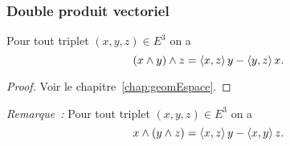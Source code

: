 \subsubsection{Double produit vectoriel}

\begin{theo}
  Pour tout triplet $(x,y,z) \in E^3$ on a
  \begin{equation}
    (x \wedge y)\wedge z = \left\langle{x},{z}\right\rangle y-\left\langle{y},{z}\right\rangle x.
  \end{equation}
\end{theo}
\begin{proof}
  Voir le chapitre~\ref{chap:geomEspace}.
\end{proof}
\emph{Remarque~:} Pour tout triplet $(x,y,z) \in E^3$ on a
\begin{equation}
  x \wedge (y \wedge z) = \left\langle{x},{z}\right\rangle y-\left\langle{x},{y}\right\rangle z.
\end{equation}
